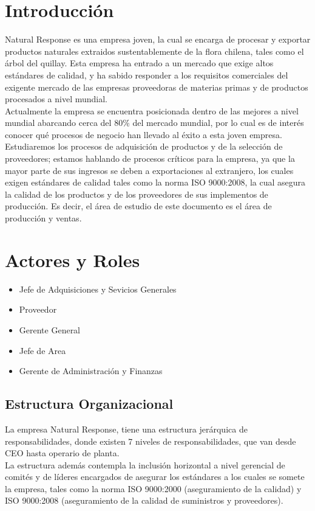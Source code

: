 \documentclass[12pt,letterpaper]{article}
\begin{document}
\section{Introducción}
Natural Response es una empresa joven, la cual se encarga de procesar y exportar productos naturales extraidos sustentablemente de la flora chilena, tales como el árbol del quillay. Esta empresa ha entrado a un mercado que exige altos estándares de calidad, y ha sabido responder a los requisitos comerciales del exigente mercado de las empresas proveedoras de materias primas y de productos procesados a nivel mundial.\\
Actualmente la empresa se encuentra posicionada dentro de las mejores a nivel mundial abarcando cerca del 80\% del mercado mundial, por lo cual es de interés conocer qué procesos de negocio han llevado al éxito a esta joven empresa. Estudiaremos los procesos de adquisición de productos y de la selección de proveedores; estamos hablando de procesos críticos para la empresa, ya que la mayor parte de sus ingresos se deben a exportaciones al extranjero, los cuales exigen estándares de calidad tales como la norma ISO 9000:2008, la cual asegura la calidad de los productos y de los proveedores de sus implementos de producción. Es decir, el área de estudio de este documento es el área de producción y ventas.\\

\section{Actores y Roles}
\begin{itemize}
\item{Jefe de Adquisiciones y Sevicios Generales}
\item{Proveedor}
\item{Gerente General}
\item{Jefe de Area}
\item{Gerente de Administración y Finanzas}
\end{itemize}

\subsection{Estructura Organizacional}
La empresa Natural Response, tiene una estructura jerárquica de responsabilidades, donde existen 7 niveles de responsabilidades, que van desde CEO hasta operario de planta.\\

La estructura además contempla la inclusión horizontal a nivel gerencial de comités y de líderes encargados de asegurar los estándares a los cuales se somete la empresa, tales como la norma ISO 9000:2000 (aseguramiento de la calidad) y ISO 9000:2008 (aseguramiento de la calidad de suministros y proveedores).
\end{document}
